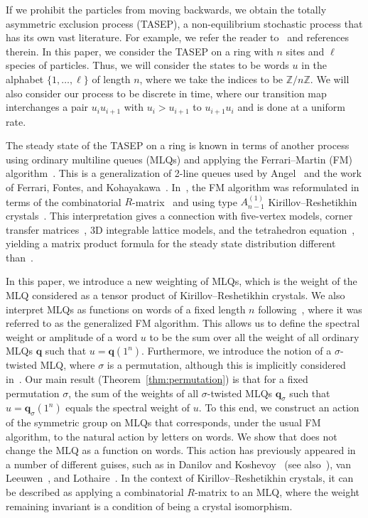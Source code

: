 \documentclass[reqno]{amsart}%
\newcommand{\0}{\phantom{c}}
\theoremstyle{plain}
\theoremstyle{definition}
\numberwithin{equation}{section}
\begin{document}
If we prohibit the particles from moving backwards, we obtain the totally
asymmetric exclusion process (TASEP), a non-equilibrium stochastic process
that has its own vast literature. For example, we refer the reader
to~\cite{AasLin17,AAMP,BE07,BP14,DEHP93,KMO15,KMO16,Liggett99} and references
therein. In this paper, we consider the TASEP on a ring with $n$ sites and
$\ell$ species of particles. Thus, we will consider the states to be words $u$
in the alphabet $\{1, \dotsc, \ell\}$ of length $n$, where we take the indices
to be $\mathbb{Z} / n \mathbb{Z}$. We will also consider our process to be
discrete in time, where our transition map interchanges a pair $u_{i} u_{i+1}$
with $u_{i} > u_{i+1}$ to $u_{i+1} u_{i}$ and is done at a uniform rate.

The steady state of the TASEP on a ring is known in terms of another process
using ordinary multiline queues (MLQs) and applying the Ferrari--Martin (FM)
algorithm~\cite{FM06,FM07}. This is a generalization of 2-line queues used by
Angel~\cite{Angel06} and the work of Ferrari, Fontes, and
Kohayakawa~\cite{FFK94}. In~\cite{KMO15,KMO16}, the FM algorithm was
reformulated in terms of the combinatorial $R$-matrix~\cite{NY97,Shimozono02}
and using type $A_{n-1}^{(1)}$ Kirillov--Reshetikhin crystals~\cite{KKMMNN92}.
This interpretation gives a connection with five-vertex models, corner
transfer matrices~\cite{Baxter89}, 3D integrable lattice models, and the
tetrahedron equation~\cite{Zam80}, yielding a matrix product formula for the
steady state distribution different than~\cite{CdGW15,EFM09,PEM09}.

In this paper, we introduce a new weighting of MLQs, which is the weight of
the MLQ considered as a tensor product of Kirillov--Reshetikhin crystals. We
also interpret MLQs as functions on words of a fixed length $n$
following~\cite{AAMP}, where it was referred to as the generalized FM
algorithm. This allows us to define the spectral weight or amplitude of a word
$u$ to be the sum over all the weight of all ordinary MLQs $\mathbf{q}$ such
that $u = \mathbf{q}(1^{n})$. Furthermore, we introduce the notion of a
$\sigma$-twisted MLQ, where $\sigma$ is a permutation, although this is
implicitly considered in~\cite{AAMP}. Our main result
(Theorem~\ref{thm:permutation}) is that for a fixed permutation $\sigma$, the
sum of the weights of all $\sigma$-twisted MLQs $\mathbf{q}_{\sigma}$ such
that $u = \mathbf{q}_{\sigma}(1^{n})$ equals the spectral weight of $u$. To
this end, we construct an action of the symmetric group on MLQs that
corresponds, under the usual FM algorithm, to the natural action by letters on
words. We show that does not change the MLQ as a function on words. This
action has previously appeared in a number of different guises, such as in
Danilov and Koshevoy~\cite{DanilovKoshevoy} (see also~\cite[Ch.~4]%
{Gorodentsev2}), van Leeuwen~\cite[Lemma~2.3]{vanLeeuwen-dc}, and
Lothaire~\cite[Ch.~5, (5.6.3)]{Loth}. In the context of Kirillov--Reshetikhin
crystals, it can be described as applying a combinatorial $R$-matrix to an
MLQ, where the weight remaining invariant is a condition of being a crystal isomorphism.
\end{document}
